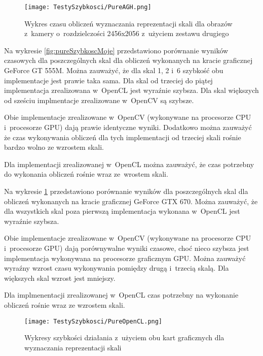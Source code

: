\begin{figure}[h]
\begin{center}
\texttt{[image: TestySzybkosci/PureAGH.png]}
\end{center}
\caption{Wykres czasu obliczeń wyznaczania reprezentacji skali dla obrazów z~kamery o~rozdzielczości 2456x2056 z~użyciem zestawu drugiego}
\label{fig:pureSzybkoscAGH}
\end{figure}

Na wykresie \ref{fig:pureSzybkoscMoje} przedstawiono porównanie wyników czasowych dla poszczególnych skal dla obliczeń wykonanych na kracie graficznej GeForce GT 555M. Można zauważyć, że dla skal 1, 2 i~6 szybkość obu implementacje jest prawie taka sama. Dla skal od trzeciej do piątej implementacja zrealizowana w~OpenCL jest wyraźnie szybsza. Dla skal większych od sześciu implmentacje zrealizowane w~OpenCV są szybsze.

Obie implementacje zrealizowane w~OpenCV (wykonywane na procesorze CPU i~procesorze GPU) dają prawie identyczne wyniki. Dodatkowo można zauważyć że czas wykonywania obliczeń dla tych implementacji od trzeciej skali rośnie bardzo wolno ze wzrostem skali.

Dla implementacji zrealizowanej w~OpenCL można zauważyć, że czas potrzebny do wykonania obliczeń rośnie wraz ze~wrostem skali.

Na wykresie \ref{fig:pureSzybkoscAGH} przedstawiono porównanie wyników dla poszczególnych skal dla obliczeń wykonanych na kracie graficznej GeForce GTX 670. Można zauważyć, że dla wszystkich skal poza pierwszą implementacja wykonana w~OpenCL jest wyraźnie szybsza.

Obie implementacje zrealizowane w~OpenCV (wykonywane na procesorze CPU i~procesorze GPU) dają porównywalne wyniki czasowe, choć nieco szybsza jest implementacja wykonywana na procesorze graficznym GPU. Można zauważyć wyraźny wzrost czasu wykonywania pomiędzy drugą i~trzecią skalą. Dla większych skal wzrost jest mniejszy. 

Dla implmenentacji zrealizowanej w~OpenCL czas potrzebny na wykonanie obliczeń rośnie wraz ze wzrostem skali. 

\begin{figure}[h]
\begin{center}
\texttt{[image: TestySzybkosci/PureOpenCL.png]}
\end{center}
\caption{Wykresy szybkości działania z~użyciem obu kart graficznych dla wyznaczania reprezentacji skali}
\label{fig:pureOpenCL}
\end{figure}

